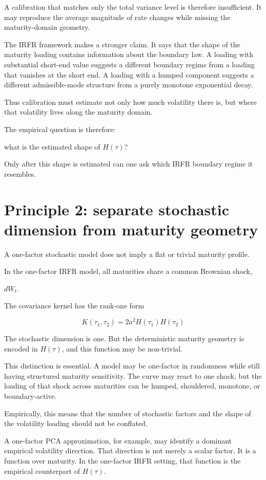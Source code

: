 \documentclass[11pt,oneside]{book}
\begin{document}
A calibration that matches only the total variance level is therefore
insufficient. It may reproduce the average magnitude of rate changes
while missing the maturity-domain geometry.

The IRFR framework makes a stronger claim. It says that the shape of the
maturity loading contains information about the boundary law. A loading
with substantial short-end value suggests a different boundary regime
from a loading that vanishes at the short end. A loading with a humped
component suggests a different admissible-mode structure from a purely
monotone exponential decay.

Thus calibration must estimate not only how much volatility there is,
but where that volatility lives along the maturity domain.

The empirical question is therefore:

what is the estimated shape of $H(\tau)$?

Only after this shape is estimated can one ask which IRFR boundary
regime it resembles.

\section{Principle 2: separate stochastic dimension from maturity
geometry}\label{principle-2-separate-stochastic-dimension-from-maturity-geometry}

A one-factor stochastic model does not imply a flat or trivial maturity
profile.

In the one-factor IRFR model, all maturities share a common Brownian
shock,

$dW_t$.

The covariance kernel has the rank-one form

\[
K(\tau_1,\tau_2)=2a^2H(\tau_1)H(\tau_2)
\]

The stochastic dimension is one. But the deterministic maturity geometry
is encoded in $H(\tau)$, and this function may be non-trivial.

This distinction is essential. A model may be one-factor in randomness
while still having structured maturity sensitivity. The curve may react
to one shock, but the loading of that shock across maturities can be
humped, shouldered, monotone, or boundary-active.

Empirically, this means that the number of stochastic factors and the
shape of the volatility loading should not be conflated.

A one-factor PCA approximation, for example, may identify a dominant
empirical volatility direction. That direction is not merely a scalar
factor. It is a function over maturity. In the one-factor IRFR setting,
that function is the empirical counterpart of $H(\tau)$.
\end{document}
